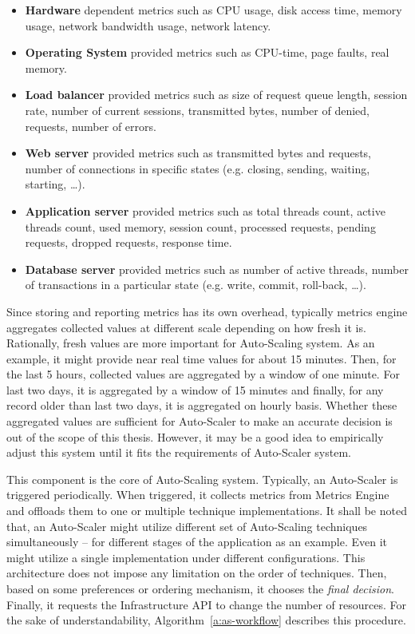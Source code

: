 \begin{description}[leftmargin=0pt]
    \begin{itemize}
        \item \textbf{Hardware} dependent metrics such as CPU usage, disk access time, memory usage, network bandwidth usage, network latency.
        \item \textbf{Operating System} provided metrics such as CPU-time, page faults, real memory.
        \item \textbf{Load balancer} provided metrics such as size of request queue length, session rate, number of current sessions, transmitted bytes, number of denied, requests, number of errors.
        \item \textbf{Web server} provided metrics such as transmitted bytes and requests, number of connections in specific states (e.g. closing, sending, waiting, starting, \dots).
        \item \textbf{Application server} provided metrics such as total threads count, active threads count, used memory, session count, processed requests, pending requests, dropped requests, response time.
        \item \textbf{Database server} provided metrics such as number of active threads, number of transactions in a particular state (e.g. write, commit, roll-back, \dots).
    \end{itemize}
    Since storing and reporting metrics has its own overhead, typically metrics engine aggregates collected values at different scale depending on how fresh it is. Rationally, fresh values are more important for Auto-Scaling system. As an example, it might provide near real time values for about 15 minutes. Then, for the last 5 hours, collected values are aggregated by a window of one minute. For last two days, it is aggregated by a window of 15 minutes and finally, for any record older than last two days, it is aggregated on hourly basis. Whether these aggregated values are sufficient for Auto-Scaler to make an accurate decision is out of the scope of this thesis. However, it may be a good idea to empirically adjust this system until it fits the requirements of Auto-Scaler system.
    \item[Auto-Scaler] This component is the core of Auto-Scaling system. Typically, an Auto-Scaler is triggered periodically. When triggered, it collects metrics from Metrics Engine and offloads them to one or multiple technique implementations. It shall be noted that, an Auto-Scaler might utilize different set of Auto-Scaling techniques simultaneously -- for different stages of the application as an example. Even it might utilize a single implementation under different configurations. This architecture does not impose any limitation on the order of techniques. Then, based on some preferences or ordering mechanism, it chooses the \emph{final decision}. Finally, it requests the Infrastructure API to change the number of resources. For the sake of understandability, Algorithm~\ref{a:as-workflow} describes this procedure.
    \begin{algorithm}[ht]
        \DontPrintSemicolon
        

\end{algorithm}
\end{description}
